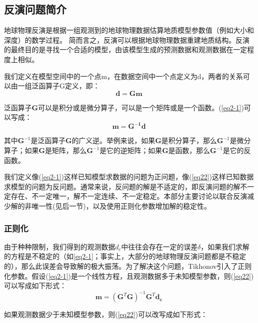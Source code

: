 \subsection{反演问题简介}

地球物理反演是根据一组观测到的地球物理数据估算地质模型参数值（例如大小和深度）的数学过程。 简而言之，反演可以根据地球物理数据重建地质结构。反演的最终目的是寻找一个合适的模型，由该模型生成的预测数据和观测数据在一定程度上相似。

我们定义在模型空间中的一个点m，在数据空间中一个点定义为d，两者的关系可以由一组泛函算子G定义，即：
\begin{equation}
    \mathbf{d}=\mathbf{Gm}
    \label{eq2-1}
\end{equation}

泛函算子$\mathbf{G}$可以是积分或是微分算子，可以是一个矩阵或是一个函数。(\ref{eq2-1})可以写成：
\begin{equation}
    \mathbf{m}=\mathbf{G^{-1}d}
    \label{eq22}
\end{equation}

其中$\mathbf{G}^{-1}$是泛函算子$\mathbf{G}$的广义逆。举例来说，如果$\mathbf{G}$是积分算子，那么$\mathbf{G}^{-1}$是微分算子；如果$\mathbf{G}$是矩阵，那么$\mathbf{G}^{-1}$是它的逆矩阵；如果$\mathbf{G}$是函数，那么$\mathbf{G}^{-1}$是它的反函数。

我们定义像(\ref{eq2-1})这样已知模型求数据的问题为正问题，像(\ref{eq22})这样已知数据求模型的问题为反问题。通常来说，反问题的解是不适定的，即反演问题的解不一定存在、不一定唯一，解不一定连续、不一定稳定。本部分主要讨论以联合反演减少解的非唯一性(见后一节)，以及使用正则化参数增加解的稳定性。

\subsubsection{正则化}

由于种种限制，我们得到的观测数据$d_c$中往往会存在一定的误差$\delta$，如果我们求解的方程是不稳定的（如\ref{eq2-1}；事实上，大部分的地球物理反演问题都是不稳定的），那么此误差会导致解的极大振荡。为了解决这个问题，Tikhonov引入了正则化参数。假设(\ref{eq2-1})是一个线性方程，且观测数据多于未知模型参数，则(\ref{eq22})可以写成如下形式：
\begin{equation}
    \mathbf{m}=(\mathbf{G}^T\mathbf{G})^{-1}\mathbf{G}^T\mathbf{d_c}
    \label{regsol1}
\end{equation}

如果观测数据少于未知模型参数，则(\ref{eq22})可以改写成如下形式：

